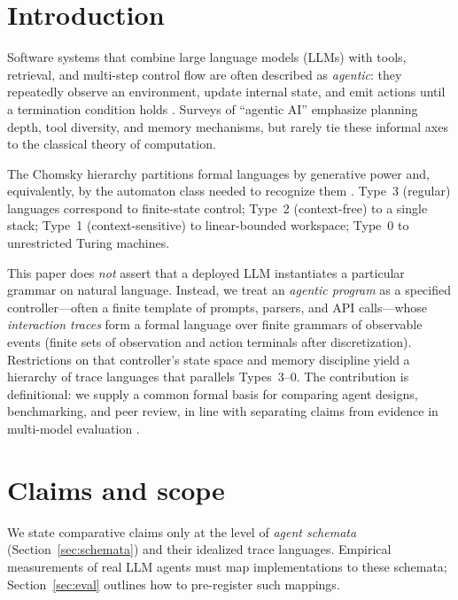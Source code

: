 \section{Introduction}

Software systems that combine large language models (LLMs) with tools, retrieval, and multi-step control flow are often described as \emph{agentic}: they repeatedly observe an environment, update internal state, and emit actions until a termination condition holds \citep{russell2020aima}. Surveys of ``agentic AI'' emphasize planning depth, tool diversity, and memory mechanisms, but rarely tie these informal axes to the classical theory of computation.

The Chomsky hierarchy partitions formal languages by generative power and, equivalently, by the automaton class needed to recognize them \citep{hopcroft2006automata}. Type~3 (regular) languages correspond to finite-state control; Type~2 (context-free) to a single stack; Type~1 (context-sensitive) to linear-bounded workspace; Type~0 to unrestricted Turing machines.

This paper does \emph{not} assert that a deployed LLM instantiates a particular grammar on natural language. Instead, we treat an \emph{agentic program} as a specified controller---often a finite template of prompts, parsers, and API calls---whose \emph{interaction traces} form a formal language over finite grammars of observable events (finite sets of observation and action terminals after discretization). Restrictions on that controller's state space and memory discipline yield a hierarchy of trace languages that parallels Types~3--0. The contribution is definitional: we supply a common formal basis for comparing agent designs, benchmarking, and peer review, in line with separating claims from evidence in multi-model evaluation \citep{react2023}.

\section*{Claims and scope}

We state comparative claims only at the level of \emph{agent schemata} (Section~\ref{sec:schemata}) and their idealized trace languages. Empirical measurements of real LLM agents must map implementations to these schemata; Section~\ref{sec:eval} outlines how to pre-register such mappings.
